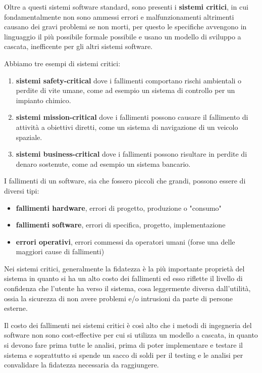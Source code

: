 \documentclass[a4paper,12pt, oneside]{book}
\begin{document}
Oltre a questi sistemi software standard, sono presenti i \textbf{sistemi critici}, 
in cui fondamentalmente non sono ammessi errori e malfunzionamenti altrimenti causano dei gravi problemi
se non morti, per questo le specifiche avvengono in linguaggio il più possibile formale possibile
e usano un modello di sviluppo a cascata, inefficente per gli altri sistemi software.

Abbiamo tre esempi di sistemi critici:
\begin{enumerate}
    \item \textbf{sistemi safety-critical} dove i fallimenti comportano rischi ambientali
        o perdite di vite umane, come ad esempio un sistema di controllo per un impianto chimico.
    \item \textbf{sistemi mission-critical} dove i fallimenti possono causare il fallimento 
        di attività a obiettivi diretti, come un sistema di navigazione di un veicolo spaziale.
    \item \textbf{sistemi business-critical} dove i fallimenti possono risultare 
        in perdite di denaro sostenute, come ad esempio un sistema bancario.
\end{enumerate}
I fallimenti di un software, sia che fossero piccoli che grandi, possono essere di diversi tipi:
\begin{itemize}
	\item \textbf{fallimenti hardware}, errori di progetto, produzione o "consumo"
	\item \textbf{fallimenti software}, errori di specifica, progetto, implementazione
	\item \textbf{errori operativi}, errori commessi da operatori umani (forse una delle maggiori cause di fallimenti)
\end{itemize}
Nei sistemi critici, generalmente la fidatezza è la più importante proprietà del sistema 
in quanto si ha un alto costo dei fallimenti ed esso riflette il livello di confidenza
che l'utente ha verso il sistema, cosa leggermente diversa dall'utilità,
ossia la sicurezza di non avere problemi e/o intrusioni da parte di persone esterne.

Il costo dei fallimenti nei sistemi critici è così alto che i metodi di ingegneria del software
non sono cost-effective per cui si utilizza un modello a cascata, in quanto si devono fare prima 
tutte le analisi, prima di poter implementare e testare il sistema e soprattutto si spende un
sacco di soldi per il testing e le analisi per convalidare la fidatezza necessaria da raggiungere.
\end{document}
